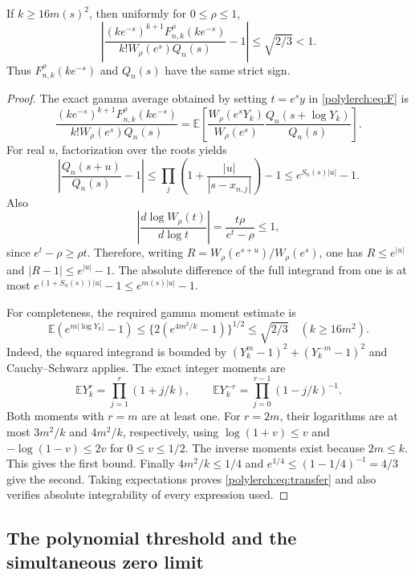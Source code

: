 \begin{lemma}
\label{polylerch:lem:transfer}
If $k\ge16m(s)^2$, then uniformly for $0\le\rho\le1$,
\begin{equation}\label{polylerch:eq:transfer}
 \left|
 \frac{(ke^{-s})^{k+1}F_{n,k}^{\rho}(ke^{-s})}
 {k!W_\rho(e^s)Q_n(s)}-1\right|
 \le\sqrt{2/3}<1.
\end{equation}
Thus $F_{n,k}^{\rho}(ke^{-s})$ and $Q_n(s)$ have the same strict sign.
\end{lemma}
\begin{proof}
The exact gamma average obtained by setting $t=e^s y$ in
\eqref{polylerch:eq:F} is
\[
 \frac{(ke^{-s})^{k+1}F_{n,k}^{\rho}(ke^{-s})}
 {k!W_\rho(e^s)Q_n(s)}
 =\mathbb E\left[
 \frac{W_\rho(e^sY_k)}{W_\rho(e^s)}
 \frac{Q_n(s+\log Y_k)}{Q_n(s)}\right].
\]
For real $u$, factorization over the roots yields
\[
 \left|\frac{Q_n(s+u)}{Q_n(s)}-1\right|
 \le\prod_j\left(1+\frac{|u|}{|s-x_{n,j}|}\right)-1
 \le e^{S_n(s)|u|}-1.
\]
Also
\[
 \left|\frac{d\log W_\rho(t)}{d\log t}\right|
 =\frac{t\rho}{e^t-\rho}\le1,
\]
since $e^t-\rho\ge\rho t$. Therefore, writing
$R=W_\rho(e^{s+u})/W_\rho(e^s)$, one has
$R\le e^{|u|}$ and $|R-1|\le e^{|u|}-1$.
The absolute difference of the full integrand from one is at most
$e^{(1+S_n(s))|u|}-1\le e^{m(s)|u|}-1$.

For completeness, the required gamma moment estimate is
\[
 \mathbb E(e^{m|\log Y_k|}-1)
 \le\{2(e^{4m^2/k}-1)\}^{1/2}\le\sqrt{2/3}
 \quad(k\ge16m^2).
\]
Indeed, the squared integrand is bounded by
$(Y_k^m-1)^2+(Y_k^{-m}-1)^2$ and Cauchy--Schwarz applies. The exact
integer moments are
\[
 \mathbb EY_k^r=\prod_{j=1}^{r}(1+j/k),\qquad
 \mathbb EY_k^{-r}=\prod_{j=0}^{r-1}(1-j/k)^{-1}.
\]
Both moments with $r=m$ are at least one. For $r=2m$, their
logarithms are at most $3m^2/k$ and $4m^2/k$, respectively, using
$\log(1+v)\le v$ and $-\log(1-v)\le2v$ for $0\le v\le1/2$.
The inverse moments exist because $2m\le k$. This gives the first
bound. Finally $4m^2/k\le1/4$ and
$e^{1/4}\le(1-1/4)^{-1}=4/3$ give the second. Taking expectations
proves \eqref{polylerch:eq:transfer} and also verifies absolute
integrability of every expression used.
\end{proof}

\subsection{The polynomial threshold and the simultaneous zero limit}

